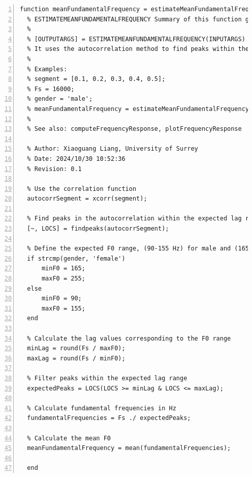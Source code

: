 \documentclass{article}
\begin{document}
\begin{lstlisting}[frame=single, numbers=left, style=Matlab-editor, caption={estimateMeanFundamentalFrequency.m}, label={lst:estimateMeanFundamentalFrequency}]
  function meanFundamentalFrequency = estimateMeanFundamentalFrequency(segment, Fs, gender)
  % ESTIMATEMEANFUNDAMENTALFREQUENCY Summary of this function goes here
  %
  % [OUTPUTARGS] = ESTIMATEMEANFUNDAMENTALFREQUENCY(INPUTARGS) This function estimates the mean fundamental frequency (F0) of a given speech segment.
  % It uses the autocorrelation method to find peaks within the expected F0 range based on the gender.
  %
  % Examples:
  % segment = [0.1, 0.2, 0.3, 0.4, 0.5];
  % Fs = 16000;
  % gender = 'male';
  % meanFundamentalFrequency = estimateMeanFundamentalFrequency(segment, Fs, gender);
  %
  % See also: computeFrequencyResponse, plotFrequencyResponse
  
  % Author: Xiaoguang Liang, University of Surrey
  % Date: 2024/10/30 10:52:36
  % Revision: 0.1
  
  % Use the correlation function
  autocorrSegment = xcorr(segment);
  
  % Find peaks in the autocorrelation within the expected lag range
  [~, LOCS] = findpeaks(autocorrSegment);
  
  % Define the expected F0 range, (90-155 Hz) for male and (165-255 Hz) for female
  if strcmp(gender, 'female')
      minF0 = 165;
      maxF0 = 255;
  else
      minF0 = 90;
      maxF0 = 155;
  end
  
  % Calculate the lag values corresponding to the F0 range
  minLag = round(Fs / maxF0);
  maxLag = round(Fs / minF0);
  
  % Filter peaks within the expected lag range
  expectedPeaks = LOCS(LOCS >= minLag & LOCS <= maxLag);
  
  % Calculate fundamental frequencies in Hz
  fundamentalFrequencies = Fs ./ expectedPeaks;
  
  % Calculate the mean F0
  meanFundamentalFrequency = mean(fundamentalFrequencies);
  
  end

\end{lstlisting}
\end{document}

